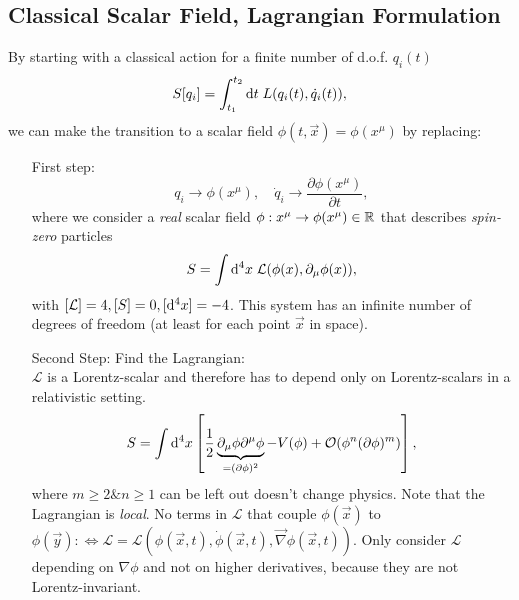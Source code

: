 \subsection{Classical Scalar Field, Lagrangian Formulation}













By starting with a classical action for a finite number of d.o.f. $q_i(t)$ 
\begin{equation}
	S[q_i] = \int_{t_1}^{t_2} \mathrm{d} t \; L(q_i(t),\dot{q}_i(t)),
\end{equation}
we can make the transition to a scalar field $\phi(t,\vec{x})=\phi(x^{\mu})$ by replacing:
\begin{enumerate}
	\item[First step:] 
	\begin{equation}
		q_i \rightarrow \phi(x^{\mu}),\quad \dot{q}_i \rightarrow \frac{\partial \phi(x^{\mu})}{\partial t},
	\end{equation}
	where we consider a \emph{real} scalar field $\phi:x^{\mu} \rightarrow \phi(x^{\mu}) \in \mathbb{R}$ that describes \emph{spin-zero} particles 
	\begin{equation}
		S = \int \mathrm{d}^4 x \; \mathcal{L}(\phi(x),\partial_{\mu} \phi(x)),
	\end{equation}
	with $[\mathcal{L}]=4,[S]=0, [\mathrm{d}^4 x]=-4$. This system has an infinite number of degrees of freedom (at least for each point $\vec{x}$ in space).
	\item[Second Step:] Find the Lagrangian:\\
	$\mathcal{L}$ is a Lorentz-scalar and therefore has to depend only on Lorentz-scalars in a relativistic setting.
	\begin{equation}
		S = \int \mathrm{d}^4 x \left[\frac{1}{2} \underbrace{\partial_{\mu}\phi \partial^{\mu} \phi}_{=(\partial \phi)^2} -V(\phi) + \mathcal{O}(\phi^n (\partial \phi)^m)\right],
	\end{equation}
	where $m\geq2 \& n\geq1$ can be left out doesn't change physics.
	Note that the Lagrangian is \emph{local}. No terms in $\mathcal{L}$ that couple $\phi(\vec{x})$ to $\phi(\vec{y}): \Leftrightarrow \mathcal{L}=\mathcal{L}\left(\phi(\vec{x},t),\dot{\phi}(\vec{x},t), \vec{\nabla} \phi(\vec{x},t)\right)$. Only consider $\mathcal{L}$ depending on $\nabla\phi$ and not on higher derivatives, because they are not Lorentz-invariant.\\

\end{enumerate}
